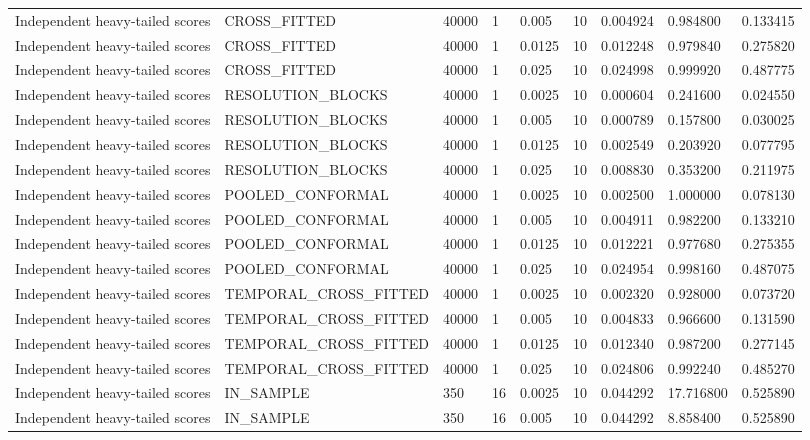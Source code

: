 \begin{tabular}{lllllllll}
Independent heavy-tailed scores & CROSS\_FITTED & 40000 & 1 & 0.005 & 10 & 0.004924 & 0.984800 & 0.133415 \\
Independent heavy-tailed scores & CROSS\_FITTED & 40000 & 1 & 0.0125 & 10 & 0.012248 & 0.979840 & 0.275820 \\
Independent heavy-tailed scores & CROSS\_FITTED & 40000 & 1 & 0.025 & 10 & 0.024998 & 0.999920 & 0.487775 \\
Independent heavy-tailed scores & RESOLUTION\_BLOCKS & 40000 & 1 & 0.0025 & 10 & 0.000604 & 0.241600 & 0.024550 \\
Independent heavy-tailed scores & RESOLUTION\_BLOCKS & 40000 & 1 & 0.005 & 10 & 0.000789 & 0.157800 & 0.030025 \\
Independent heavy-tailed scores & RESOLUTION\_BLOCKS & 40000 & 1 & 0.0125 & 10 & 0.002549 & 0.203920 & 0.077795 \\
Independent heavy-tailed scores & RESOLUTION\_BLOCKS & 40000 & 1 & 0.025 & 10 & 0.008830 & 0.353200 & 0.211975 \\
Independent heavy-tailed scores & POOLED\_CONFORMAL & 40000 & 1 & 0.0025 & 10 & 0.002500 & 1.000000 & 0.078130 \\
Independent heavy-tailed scores & POOLED\_CONFORMAL & 40000 & 1 & 0.005 & 10 & 0.004911 & 0.982200 & 0.133210 \\
Independent heavy-tailed scores & POOLED\_CONFORMAL & 40000 & 1 & 0.0125 & 10 & 0.012221 & 0.977680 & 0.275355 \\
Independent heavy-tailed scores & POOLED\_CONFORMAL & 40000 & 1 & 0.025 & 10 & 0.024954 & 0.998160 & 0.487075 \\
Independent heavy-tailed scores & TEMPORAL\_CROSS\_FITTED & 40000 & 1 & 0.0025 & 10 & 0.002320 & 0.928000 & 0.073720 \\
Independent heavy-tailed scores & TEMPORAL\_CROSS\_FITTED & 40000 & 1 & 0.005 & 10 & 0.004833 & 0.966600 & 0.131590 \\
Independent heavy-tailed scores & TEMPORAL\_CROSS\_FITTED & 40000 & 1 & 0.0125 & 10 & 0.012340 & 0.987200 & 0.277145 \\
Independent heavy-tailed scores & TEMPORAL\_CROSS\_FITTED & 40000 & 1 & 0.025 & 10 & 0.024806 & 0.992240 & 0.485270 \\
Independent heavy-tailed scores & IN\_SAMPLE & 350 & 16 & 0.0025 & 10 & 0.044292 & 17.716800 & 0.525890 \\
Independent heavy-tailed scores & IN\_SAMPLE & 350 & 16 & 0.005 & 10 & 0.044292 & 8.858400 & 0.525890 \\

\end{tabular}
